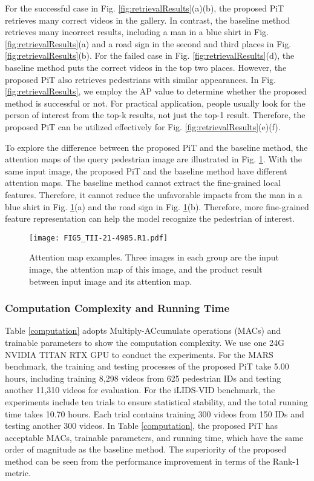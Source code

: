 \documentclass[journal]{IEEEtran}
\begin{document}
{\begin{minipage}{\textwidth}
For the successful case in Fig. \ref{fig:retrievalResults}(a)(b), the proposed PiT retrieves many correct videos in the gallery. In contrast, the baseline method retrieves many incorrect results, including a man in a blue shirt in Fig. \ref{fig:retrievalResults}(a) and a road sign in the second and third places in Fig. \ref{fig:retrievalResults}(b). For the failed case in Fig. \ref{fig:retrievalResults}(d), the baseline method puts the correct videos in the top two places. However, the proposed PiT also retrieves pedestrians with similar appearances. 
In Fig. \ref{fig:retrievalResults}, we employ the AP value to determine whether the proposed method is successful or not. For practical application, people usually look for the person of interest from the top-k results, not just the top-1 result. Therefore, the proposed PiT can be utilized effectively for Fig. \ref{fig:retrievalResults}(e)(f).

To explore the difference between the proposed PiT and the baseline method, the attention maps of the query pedestrian image are illustrated in Fig. \ref{attentions}. 
With the same input image, the proposed PiT and the baseline method have different attention maps. The baseline method cannot extract the fine-grained local features. Therefore, it cannot reduce the unfavorable impacts from the man in a blue shirt in Fig. \ref{attentions}(a) and the road sign in Fig. \ref{attentions}(b).
Therefore, more fine-grained feature representation can help the model recognize the pedestrian of interest.

\begin{figure}[htp]
	\centering
	\texttt{[image: FIG5\_TII-21-4985.R1.pdf]}
	\caption{Attention map examples. Three images in each group are the input image, the attention map of this image, and the product result between input image and its attention map.}
	\label{attentions}
\end{figure}

\subsubsection{Computation Complexity and Running Time} \label{sec:computation}
Table \ref{computation} adopts Multiply-ACcumulate operations (MACs) and trainable parameters to show the computation complexity. We use one 24G NVIDIA TITAN RTX GPU to conduct the experiments. For the MARS benchmark, the training and testing processes of the proposed PiT take 5.00 hours, including training 8,298 videos from 625 pedestrian IDs and testing another 11,310 videos for evaluation. For the iLIDS-VID benchmark, the experiments include ten trials to ensure statistical stability, and the total running time takes 10.70 hours. Each trial contains training 300 videos from 150 IDs and testing another 300 videos. In Table \ref{computation}, the proposed PiT has acceptable MACs, trainable parameters, and running time, which have the same order of magnitude as the baseline method. The superiority of the proposed method can be seen from the performance improvement in terms of the Rank-1 metric.


\end{minipage}}
\end{document}
